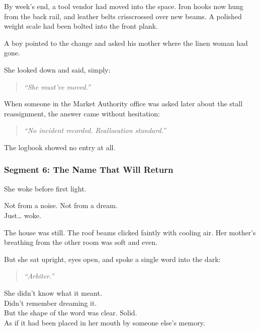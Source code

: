 \documentclass[9pt]{article}
\begin{document}
\vspace{1em}

By week’s end, a tool vendor had moved into the space. Iron hooks now hung from the back rail, and leather belts crisscrossed over new beams. A polished weight scale had been bolted into the front plank.

A boy pointed to the change and asked his mother where the linen woman had gone.

She looked down and said, simply:

\begin{quote}
\textit{“She must’ve moved.”}
\end{quote}

\vspace{1em}

When someone in the Market Authority office was asked later about the stall reassignment, the answer came without hesitation:

\begin{quote}
\textit{“No incident recorded. Reallocation standard.”}
\end{quote}

The logbook showed no entry at all.

\newpage

\subsubsection*{Segment 6: The Name That Will Return}

She woke before first light.

Not from a noise. Not from a dream.\\
Just… woke.

The house was still. The roof beams clicked faintly with cooling air. Her mother’s breathing from the other room was soft and even.

But she sat upright, eyes open, and spoke a single word into the dark:

\begin{quote}
\textit{“Arbiter.”}
\end{quote}

She didn’t know what it meant.\\
Didn’t remember dreaming it.\\
But the shape of the word was clear. Solid.\\
As if it had been placed in her mouth by someone else’s memory.

\vspace{1em}
\end{document}
